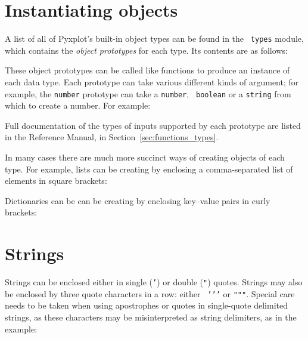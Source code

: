 \section{Instantiating objects}

A list of all of Pyxplot's built-in object types can be found in the {\tt
types} module, which contains the {\it object prototypes} for each type. Its
contents are as follows:

\vspace{3mm}

\vspace{3mm}

\noindent These object prototypes can be called like functions to produce an
instance of each data type. Each prototype can take various different kinds of
argument; for example, the {\tt number} prototype can take a {\tt number}, {\tt
boolean} or a {\tt string} from which to create a number. For example:

\vspace{3mm}

\vspace{3mm}

\noindent Full documentation of the types of inputs supported by each prototype
are listed in the Reference Manual, in Section~\ref{sec:functions_types}.

In many cases there are much more succinct ways of creating objects of each
type. For example, lists can be creating by enclosing a comma-separated list of
elements in square brackets:

\vspace{3mm}

\vspace{3mm}

\noindent Dictionaries can be can be creating by enclosing key--value pairs in curly brackets:

\vspace{3mm}

\vspace{3mm}


\section{Strings}
\label{sec:stringvars}

Strings can be enclosed either in single ({\tt '}) or double ({\tt "}) quotes.
Strings may also be enclosed by three quote characters in a row: either {\tt
\textquoteright\textquoteright\textquoteright} or {\tt """}. Special care needs
to be taken when using apostrophes or quotes in single-quote delimited strings,
as these characters may be misinterpreted as string delimiters, as in the
example:


